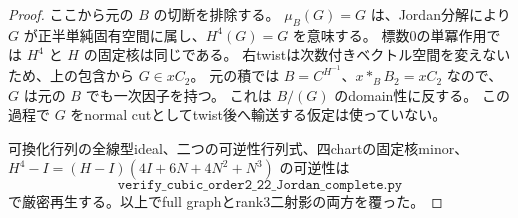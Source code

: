 \begin{proof}
ここから元の $B$ の切断を排除する。
$\mu_B(G)=G$ は、Jordan分解により $G$ が正半単純固有空間に属し、$H^4(G)=G$ を意味する。
標数0の単冪作用では $H^4$ と $H$ の固定核は同じである。
右twistは次数付きベクトル空間を変えないため、上の包含から $G\in xC_2$。
元の積では $B=C^{H^{-1}}$、$x*_B B_2=xC_2$ なので、$G$ は元の $B$ でも一次因子を持つ。
これは $B/(G)$ のdomain性に反する。
この過程で $G$ をnormal cutとしてtwist後へ輸送する仮定は使っていない。

可換化行列の全線型ideal、二つの可逆性行列式、四chartの固定核minor、
$H^4-I=(H-I)(4I+6N+4N^2+N^3)$ の可逆性は
\[
\texttt{verify\_cubic\_order2\_22\_Jordan\_complete.py}
\]
で厳密再生する。以上でfull graphとrank3二射影の両方を覆った。
\end{proof}

